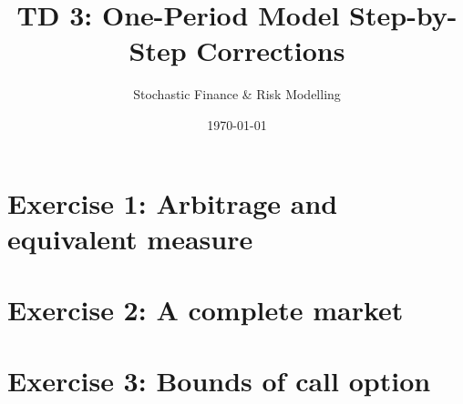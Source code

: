 \documentclass{article}
\begin{document}
\title{TD 3: One-Period Model Step-by-Step Corrections}
\author{Stochastic Finance \& Risk Modelling}
\date{\today}

\maketitle

\tableofcontents
\newpage


\section{Exercise 1: Arbitrage and equivalent measure}


\newpage
\section{Exercise 2: A complete market}


\newpage
\section{Exercise 3: Bounds of call option}

\end{document}
